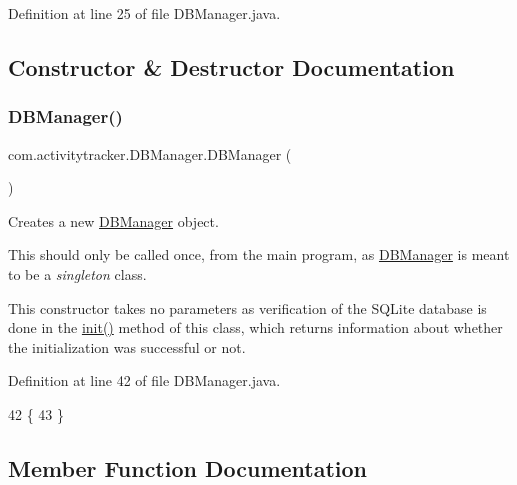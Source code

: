 Definition at line 25 of file D\+B\+Manager.\+java.



\subsection{Constructor \& Destructor Documentation}
\mbox{\label{classcom_1_1activitytracker_1_1_d_b_manager_ac1f558ef56fe02d74fe103a473a15bb5}} 
\subsubsection{\texorpdfstring{D\+B\+Manager()}{DBManager()}}
{\footnotesize\ttfamily com.\+activitytracker.\+D\+B\+Manager.\+D\+B\+Manager (\begin{DoxyParamCaption}{ }\end{DoxyParamCaption})\hspace{0.3cm}{\ttfamily [package]}}

Creates a new \mbox{\hyperlink{classcom_1_1activitytracker_1_1_d_b_manager}{D\+B\+Manager}} object.

This should only be called once, from the main program, as \mbox{\hyperlink{classcom_1_1activitytracker_1_1_d_b_manager}{D\+B\+Manager}} is meant to be a {\itshape singleton} class.

This constructor takes no parameters as verification of the S\+Q\+Lite database is done in the \mbox{\hyperlink{classcom_1_1activitytracker_1_1_d_b_manager_a41df4600bb5901a26a4ea6a7108a70b9}{init()}} method of this class, which returns information about whether the initialization was successful or not. 

Definition at line 42 of file D\+B\+Manager.\+java.


\begin{DoxyCode}
42                 \{
43     \}
\end{DoxyCode}


\subsection{Member Function Documentation}
\mbox{\label{classcom_1_1activitytracker_1_1_d_b_manager_a39ef296348c7bfacf965b3417655f4e5}} 
